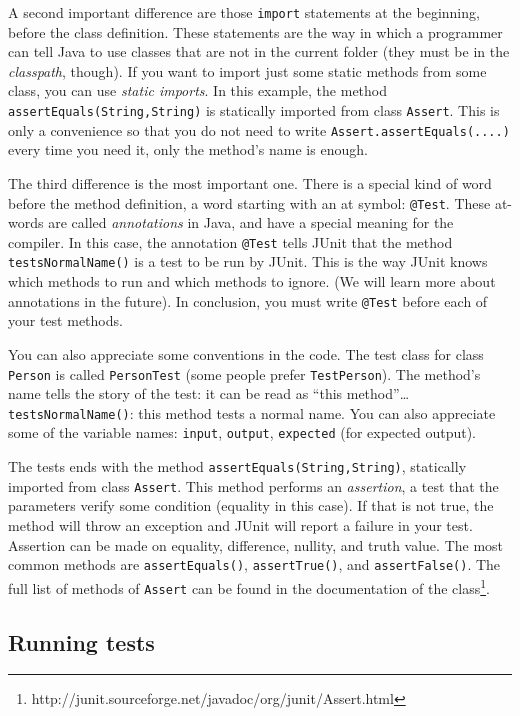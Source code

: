 A second important difference are those \verb+import+ statements at
the beginning, before the class definition. These  statements
are the way in which a programmer can tell Java to use classes that
are not in the current folder (they must be in the \emph{classpath},
though). If you want to import just some static methods from some
class, you can use \emph{static imports}. In this example, the method
\verb+assertEquals(String,String)+ is statically imported from class
\verb+Assert+. This is only a convenience so that you do not need to
write \verb+Assert.assertEquals(....)+ every time you need it, 
only the method's name is enough. 

The third difference is the most important one. There is a special
kind of word before the method definition, a word starting with an at
symbol: \verb+@Test+. These at-words are called \emph{annotations} in
Java, and have a special meaning for the compiler. In this case, the
annotation \verb+@Test+ tells JUnit that the method
\verb+testsNormalName()+ is a test to be run by JUnit. This is the way
JUnit knows which methods to run and which methods to ignore. (We will
learn more about annotations in the future). In conclusion, you must
write \verb+@Test+ before each of your test methods. 

You can also appreciate some conventions in the code. The test class
for class \verb+Person+ is called \verb+PersonTest+ (some people
prefer \verb+TestPerson+). The method's name tells the story of
the test: it can be read as ``this method''\ldots \verb+testsNormalName()+:
this method tests a normal name. You can also appreciate some of the
variable names: \verb+input+, \verb+output+, \verb+expected+ (for
expected output). 

The tests ends with the method \verb+assertEquals(String,String)+,
statically imported from class \verb+Assert+. This method performs an
\emph{assertion}, a test that the parameters verify some condition
(equality in this case). If that is not true, the method will throw an
exception and JUnit will report a failure in your test. Assertion can
be made on equality, difference, nullity, and truth value. The most
common methods are \verb+assertEquals()+, \verb+assertTrue()+, and
\verb+assertFalse()+. The full list
of methods of \verb+Assert+ can be found in the documentation of the
class\footnote{http://junit.sourceforge.net/javadoc/org/junit/Assert.html}. 

\subsection{Running tests}
\label{sec:running-tests}

